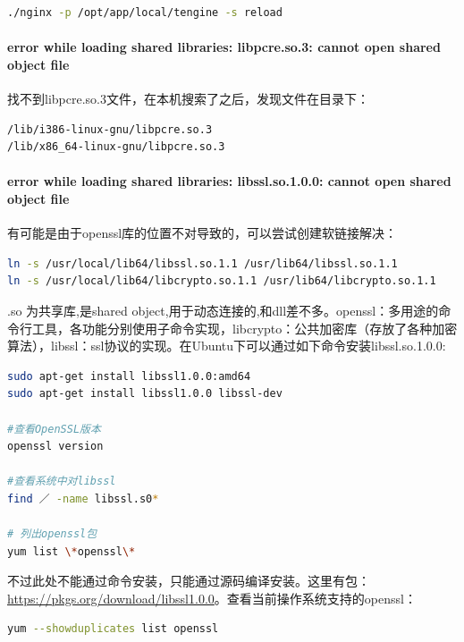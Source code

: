 \documentclass[letter]{book}
\begin{document}
\begin{lstlisting}[language=bash]
./nginx -p /opt/app/local/tengine -s reload
\end{lstlisting}

\paragraph{error while loading shared libraries: libpcre.so.3: cannot open shared object file}

找不到libpcre.so.3文件，在本机搜索了之后，发现文件在目录下：

\begin{lstlisting}[language=bash]
/lib/i386-linux-gnu/libpcre.so.3
/lib/x86_64-linux-gnu/libpcre.so.3
\end{lstlisting}

\paragraph{error while loading shared libraries: libssl.so.1.0.0: cannot open shared object file}

有可能是由于openssl库的位置不对导致的，可以尝试创建软链接解决：

\begin{lstlisting}[language=bash]
ln -s /usr/local/lib64/libssl.so.1.1 /usr/lib64/libssl.so.1.1  
ln -s /usr/local/lib64/libcrypto.so.1.1 /usr/lib64/libcrypto.so.1.1  
\end{lstlisting}

.so 为共享库,是shared object,用于动态连接的,和dll差不多。openssl：多用途的命令行工具，各功能分别使用子命令实现，libcrypto：公共加密库（存放了各种加密算法），libssl：ssl协议的实现。在Ubuntu下可以通过如下命令安装libssl.so.1.0.0:

\begin{lstlisting}[language=bash]
sudo apt-get install libssl1.0.0:amd64
sudo apt-get install libssl1.0.0 libssl-dev

#查看OpenSSL版本
openssl version

#查看系统中对libssl
find ／ -name libssl.s0*

# 列出openssl包
yum list \*openssl\*
\end{lstlisting}

不过此处不能通过命令安装，只能通过源码编译安装。这里有包： \url{https://pkgs.org/download/libssl1.0.0}。查看当前操作系统支持的openssl：

\begin{lstlisting}[language=bash]
yum --showduplicates list openssl
\end{lstlisting}
\end{document}
